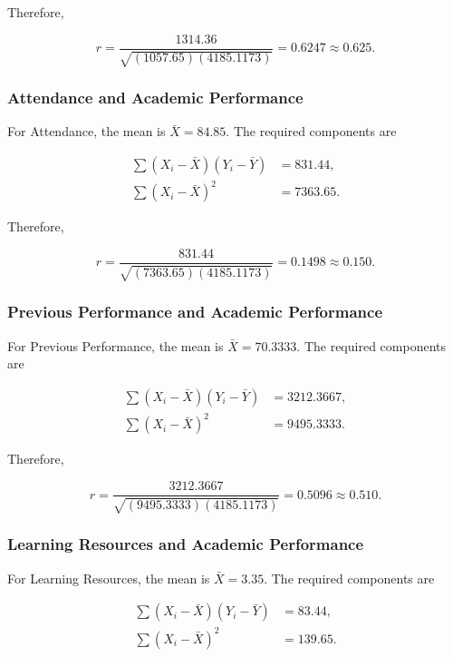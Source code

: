 Therefore,

\begin{equation}
r =
\frac{1314.36}
{\sqrt{(1057.65)(4185.1173)}}
=0.6247\approx\mathbf{0.625}.
\end{equation}

\subsubsection{Attendance and Academic Performance}

For Attendance, the mean is $\bar{X}=84.85$. The required components are

\begin{align*}
\sum(X_i-\bar{X})(Y_i-\bar{Y}) &= 831.44,\\
\sum(X_i-\bar{X})^2 &= 7363.65.
\end{align*}

Therefore,

\begin{equation}
r =
\frac{831.44}
{\sqrt{(7363.65)(4185.1173)}}
=0.1498\approx\mathbf{0.150}.
\end{equation}

\subsubsection{Previous Performance and Academic Performance}

For Previous Performance, the mean is $\bar{X}=70.3333$. The required components are

\begin{align*}
\sum(X_i-\bar{X})(Y_i-\bar{Y}) &= 3212.3667,\\
\sum(X_i-\bar{X})^2 &= 9495.3333.
\end{align*}

Therefore,

\begin{equation}
r =
\frac{3212.3667}
{\sqrt{(9495.3333)(4185.1173)}}
=0.5096\approx\mathbf{0.510}.
\end{equation}

\subsubsection{Learning Resources and Academic Performance}

For Learning Resources, the mean is $\bar{X}=3.35$. The required components are

\begin{align*}
\sum(X_i-\bar{X})(Y_i-\bar{Y}) &= 83.44,\\
\sum(X_i-\bar{X})^2 &= 139.65.
\end{align*}

